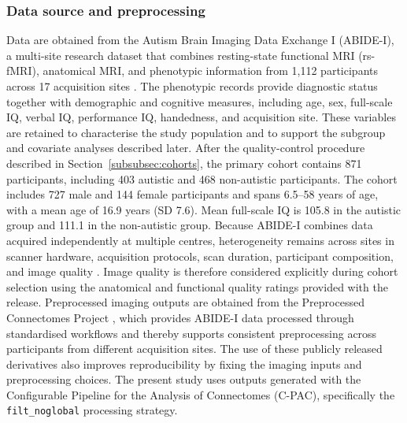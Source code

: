 \subsubsection{Data source and preprocessing}
\label{subsubsec:data-preprocessing}

Data are obtained from the Autism Brain Imaging Data Exchange I (ABIDE-I), a multi-site research dataset that combines resting-state functional MRI (rs-fMRI), anatomical MRI, and phenotypic information from 1,112 participants across 17 acquisition sites \citep{DiMartinoetal2014}. The phenotypic records provide diagnostic status together with demographic and cognitive measures, including age, sex, full-scale IQ, verbal IQ, performance IQ, handedness, and acquisition site. These variables are retained to characterise the study population and to support the subgroup and covariate analyses described later. After the quality-control procedure described in Section~\ref{subsubsec:cohorts}, the primary cohort contains 871 participants, including 403 autistic and 468 non-autistic participants. The cohort includes 727 male and 144 female participants and spans 6.5--58 years of age, with a mean age of 16.9 years (SD 7.6). Mean full-scale IQ is 105.8 in the autistic group and 111.1 in the non-autistic group. Because ABIDE-I combines data acquired independently at multiple centres, heterogeneity remains across sites in scanner hardware, acquisition protocols, scan duration, participant composition, and image quality \citep{Abrahametal2017}. Image quality is therefore considered explicitly during cohort selection using the anatomical and functional quality ratings provided with the release. Preprocessed imaging outputs are obtained from the Preprocessed Connectomes Project \citep{Craddocketal2013}, which provides ABIDE-I data processed through standardised workflows and thereby supports consistent preprocessing across participants from different acquisition sites. The use of these publicly released derivatives also improves reproducibility by fixing the imaging inputs and preprocessing choices. The present study uses outputs generated with the Configurable Pipeline for the Analysis of Connectomes (C-PAC), specifically the \texttt{filt\_noglobal} processing strategy.

